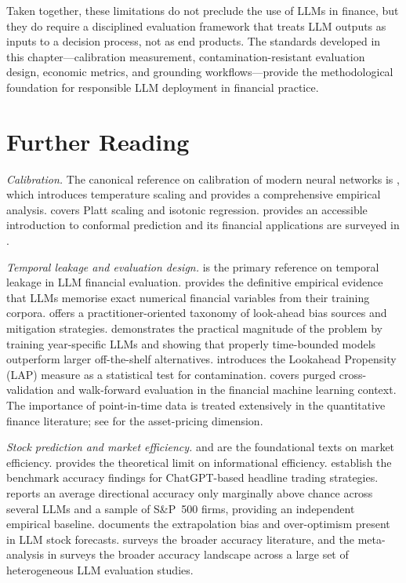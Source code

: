 Taken together, these limitations do not preclude the use of LLMs in finance, but they
do require a disciplined evaluation framework that treats LLM outputs as inputs to a
decision process, not as end products. The standards developed in this chapter---calibration
measurement, contamination-resistant evaluation design, economic metrics, and grounding
workflows---provide the methodological foundation for responsible LLM deployment in
financial practice.

\section{Further Reading}
\label{sec:ch13-further-reading}

\emph{Calibration.} The canonical reference on calibration of modern neural networks
is \citet{guo2017calibration}, which introduces temperature scaling and provides a
comprehensive empirical analysis. \citet{niculescu2005predicting} covers Platt scaling
and isotonic regression. \citet{angelopoulos2022gentle} provides an accessible
introduction to conformal prediction and its financial applications are surveyed in
\citet{chen2024uncertainty}.

\emph{Temporal leakage and evaluation design.} \citet{ziemke2024temporal} is the
primary reference on temporal leakage in LLM financial evaluation. \citet{LopezLiraTangZhu2025}
provides the definitive empirical evidence that LLMs memorise exact numerical financial
variables from their training corpora. \citet{NoguerAlonso2024} offers a practitioner-oriented
taxonomy of look-ahead bias sources and mitigation strategies. \citet{RahimikiaDrinkall2024}
demonstrates the practical magnitude of the problem by training year-specific LLMs and
showing that properly time-bounded models outperform larger off-the-shelf alternatives.
\citet{GaoJiangYan2025} introduces the Lookahead Propensity (LAP) measure as a
statistical test for contamination. \citet{lopezdeprado2018advances} covers purged
cross-validation and walk-forward evaluation in the financial machine learning context.
The importance of point-in-time data is treated extensively in the quantitative finance
literature; see \citet{lewellen2010empirical} for the asset-pricing dimension.

\emph{Stock prediction and market efficiency.} \citet{fama1970efficient} and
\citet{fama1991efficient} are the foundational texts on market efficiency.
\citet{grossman1980impossibility} provides the theoretical limit on informational
efficiency. \citet{LopezLiraTang2023} establish the
benchmark accuracy findings for ChatGPT-based headline trading strategies.
\citet{VidalSSRN2024} reports an average directional accuracy only marginally above chance
across several LLMs and a sample of S\&P~500 firms, providing an independent empirical baseline. \citet{ChenGreenGulenZhou2024}
documents the extrapolation bias and over-optimism present in LLM stock forecasts.
\citet{xu2024stock} surveys the broader accuracy literature, and the meta-analysis in
\citet{zhao2025frontiers} surveys the broader accuracy landscape across a large set of heterogeneous LLM evaluation studies.

